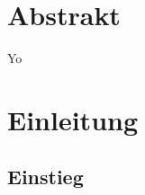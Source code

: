 \documentclass{Paper}
\begin{document}
\maketitle


\tableofcontents
\clearpage
	
\section{Abstrakt}
	Yo
	

\section{Einleitung}
\subsection{Einstieg}
\end{document}
